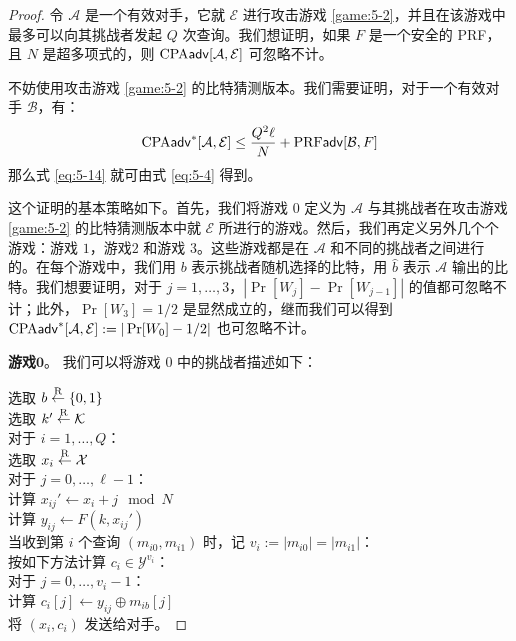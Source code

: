 \begin{proof}
令 $\mathcal{A}$ 是一个有效对手，它就 $\mathcal{E}$ 进行攻击游戏 \ref{game:5-2}，并且在该游戏中最多可以向其挑战者发起 $Q$ 次查询。我们想证明，如果 $F$ 是一个安全的 PRF，且 $N$ 是超多项式的，则 ${\rm CPA}\mathsf{adv}[\mathcal{A},\mathcal{E}]$ 可忽略不计。

不妨使用攻击游戏 \ref{game:5-2} 的比特猜测版本。我们需要证明，对于一个有效对手 $\mathcal{B}$，有：
\begin{equation}\label{eq:5-15}
{\rm CPA}\mathsf{adv}^*[\mathcal{A}, \mathcal{E}]\leq\frac{Q^2\ell}{N}+{\rm PRF\mathsf{adv}}[\mathcal{B},F]
\end{equation}
那么式 \ref{eq:5-14} 就可由式 \ref{eq:5-4} 得到。

这个证明的基本策略如下。首先，我们将游戏 $0$ 定义为 $\mathcal{A}$ 与其挑战者在攻击游戏 \ref{game:5-2} 的比特猜测版本中就 $\mathcal{E}$ 所进行的游戏。然后，我们再定义另外几个个游戏：游戏 $1$，游戏$2$ 和游戏 $3$。这些游戏都是在 $\mathcal{A}$ 和不同的挑战者之间进行的。在每个游戏中，我们用 $b$ 表示挑战者随机选择的比特，用 $\hat b$ 表示 $\mathcal{A}$ 输出的比特。我们想要证明，对于 $j = 1,\dots,3$，$|\Pr[W_j]-\Pr[W_{j-1}]|$ 的值都可忽略不计；此外，$\Pr[W_3]={1}/{2}$ 是显然成立的，继而我们可以得到 ${\rm CPA}\mathsf{adv}^*[\mathcal{A}, \mathcal{E}]:=|\Pr[W_0]-{1}/{2}|$ 也可忽略不计。

\vspace{5pt}

\noindent\textbf{游戏$\mathbf{0}$}。
我们可以将游戏 $0$ 中的挑战者描述如下：

\vspace{5pt}

\hspace*{5pt} 选取 $b\overset{\rm R}\leftarrow\{0,1\}$\\
\hspace*{26pt} 选取 $k'\overset{\rm R}\leftarrow\mathcal{K}$\\
\hspace*{26pt} 对于 $i=1,\dots,Q$：\\
\hspace*{50pt} 选取 $x_i\overset{\rm R}\leftarrow\mathcal{X}$\\
\hspace*{50pt} 对于 $j=0,\dots,\ell-1$：\\
\hspace*{75pt} 计算 $x_{ij}'\leftarrow x_i+j\mod N$\\
\hspace*{75pt} 计算 $y_{ij}\leftarrow F(k,x_{ij}')$\\
\hspace*{26pt} 当收到第 $i$ 个查询 $(m_{i0},m_{i1})$ 时，记 $v_i:=|m_{i0}|=|m_{i1}|$：\\
\hspace*{50pt} 按如下方法计算 $c_i\in\mathcal{Y}^{v_i}$：\\
\hspace*{75pt} 对于 $j=0,\dots,v_i-1$：\\
\hspace*{100pt} 计算 $c_i[j]\leftarrow y_{ij}\oplus m_{ib}[j]$\\
\hspace*{50pt} 将 $(x_i,c_i)$ 发送给对手。


\end{proof}
